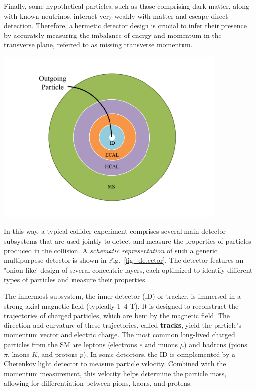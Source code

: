 Finally, some hypothetical particles, such as those comprising dark matter, along with known neutrinos, interact very weakly with matter and escape direct detection. Therefore, a hermetic detector design is crucial to infer their presence by accurately measuring the imbalance of energy and momentum in the transverse plane, referred to as missing transverse momentum.

\begin{center}
    \includegraphics[width=0.85\textwidth]{Images/transversal_detector.pdf}
    \label{fig_detector}
\end{center}

In this way, a typical collider experiment comprises several main detector subsystems that are used jointly to detect and measure the properties of particles produced in the collision. A \textit{schematic representation} of such a generic multipurpose detector is shown in Fig.~\ref{fig_detector}. The detector features an "onion-like" design of several concentric layers, each optimized to identify different types of particles and measure their properties.

The innermost subsystem, the inner detector (ID) or tracker, is immersed in a strong axial magnetic field (typically 1–4 T). It is designed to reconstruct the trajectories of charged particles, which are bent by the magnetic field. The direction and curvature of these trajectories, called \textbf{tracks}, yield the particle's momentum vector and electric charge. The most common long-lived charged particles from the SM are leptons (electrons $e$ and muons $\mu$) and hadrons (pions $\pi$, kaons $K$, and protons $p$). In some detectors, the ID is complemented by a Cherenkov light detector to measure particle velocity. Combined with the momentum measurement, this velocity helps determine the particle mass, allowing for differentiation between pions, kaons, and protons.

